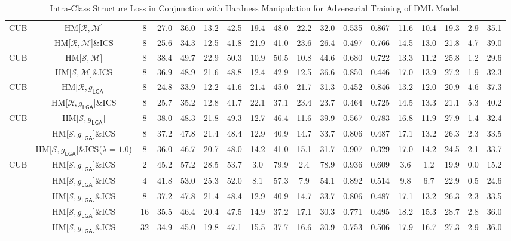 \begin{table*}
{\begin{tabular}{c|cc|cccc|ccccc|ccccc|c}
\multirow{2}{*}{CUB} & HM{[}$\mathcal{R},\mathcal{M}${]} & 8 & 27.0 & 36.0 & 13.2 & 42.5 & 19.4 & 48.0 & 22.2 & 32.0 & 0.535 & 0.867 & 11.6 & 10.4 & 19.3 & 2.9 & 35.1\tabularnewline
 & HM{[}$\mathcal{R},\mathcal{M}${]}\&ICS & 8 & 25.6 & 34.3 & 12.5 & 41.8 & 21.9 & 41.0 & 23.6 & 26.4 & 0.497 & 0.766 & 14.5 & 13.0 & 21.8 & 4.7 & 39.0\tabularnewline
\hline 
\multirow{2}{*}{CUB} & HM{[}$\mathcal{S},\mathcal{M}${]} & 8 & 38.4 & 49.7 & 22.9 & 50.3 & 10.9 & 50.5 & 10.8 & 44.6 & 0.680 & 0.722 & 13.3 & 11.2 & 25.8 & 1.2 & 29.6\tabularnewline
 & HM{[}$\mathcal{S},\mathcal{M}${]}\&ICS & 8 & 36.9 & 48.9 & 21.6 & 48.8 & 12.4 & 42.9 & 12.5 & 36.6 & 0.850 & 0.446 & 17.0 & 13.9 & 27.2 & 1.9 & 32.3\tabularnewline
\hline 
\multirow{2}{*}{CUB} & HM{[}$\mathcal{R},g_{\mathsf{LGA}}${]} & 8 & 24.8 & 33.9 & 12.2 & 41.6 & 21.4 & 45.0 & 21.7 & 31.3 & 0.452 & 0.846 & 13.2 & 12.0 & 20.9 & 4.6 & 37.3\tabularnewline
 & HM{[}$\mathcal{R},g_{\mathsf{LGA}}${]}\&ICS & 8 & 25.7 & 35.2 & 12.8 & 41.7 & 22.1 & 37.1 & 23.4 & 23.7 & 0.464 & 0.725 & 14.5 & 13.3 & 21.1 & 5.3 & 40.2\tabularnewline
\hline 
\multirow{3}{*}{CUB} & HM{[}$\mathcal{S},g_{\mathsf{LGA}}${]} & 8 & 38.0 & 48.3 & 21.8 & 49.3 & 12.7 & 46.4 & 11.6 & 39.9 & 0.567 & 0.783 & 16.8 & 11.9 & 27.9 & 1.4 & 32.4\tabularnewline
 & HM{[}$\mathcal{S},g_{\mathsf{LGA}}${]}\&ICS & 8 & 37.2 & 47.8 & 21.4 & 48.4 & 12.9 & 40.9 & 14.7 & 33.7 & 0.806 & 0.487 & 17.1 & 13.2 & 26.3 & 2.3 & 33.5\tabularnewline
	& HM{[}$\mathcal{S},g_{\mathsf{LGA}}${]}\&ICS($\lambda{=}1.0$) & 8 & 36.0 & 46.7 & 20.7 & 48.0 & 14.2 & 41.0 & 15.1 & 31.7 & 0.907 & 0.329 & 17.0 & 14.2 & 24.5 & 2.1 & 33.7\tabularnewline
\hline 
\multirow{5}{*}{CUB} & HM{[}$\mathcal{S},g_{\mathsf{LGA}}${]}\&ICS & 2 & 45.2 & 57.2 & 28.5 & 53.7 & 3.0 & 79.9 & 2.4 & 78.9 & 0.936 & 0.609 & 3.6 & 1.2 & 19.9 & 0.0 & 15.2\tabularnewline
 & HM{[}$\mathcal{S},g_{\mathsf{LGA}}${]}\&ICS & 4 & 41.8 & 53.0 & 25.3 & 52.0 & 8.1 & 57.3 & 7.9 & 54.1 & 0.892 & 0.514 & 9.8 & 6.7 & 22.9 & 0.5 & 24.6\tabularnewline
 & HM{[}$\mathcal{S},g_{\mathsf{LGA}}${]}\&ICS & 8 & 37.2 & 47.8 & 21.4 & 48.4 & 12.9 & 40.9 & 14.7 & 33.7 & 0.806 & 0.487 & 17.1 & 13.2 & 26.3 & 2.3 & 33.5\tabularnewline
 & HM{[}$\mathcal{S},g_{\mathsf{LGA}}${]}\&ICS & 16 & 35.5 & 46.4 & 20.4 & 47.5 & 14.9 & 37.2 & 17.1 & 30.3 & 0.771 & 0.495 & 18.2 & 15.3 & 28.7 & 2.8 & 36.0\tabularnewline
 & HM{[}$\mathcal{S},g_{\mathsf{LGA}}${]}\&ICS & 32 & 34.9 & 45.0 & 19.8 & 47.1 & 15.5 & 37.7 & 16.6 & 30.9 & 0.753 & 0.506 & 17.9 & 16.7 & 27.3 & 2.9 & 36.0\tabularnewline

	\bottomrule

\end{tabular}

	}
	\vspace{-0.8em}
\caption{Intra-Class Structure Loss in Conjunction with Hardness Manipulation for Adversarial Training of DML Model.}
\label{tab:ics}
\end{table*}

